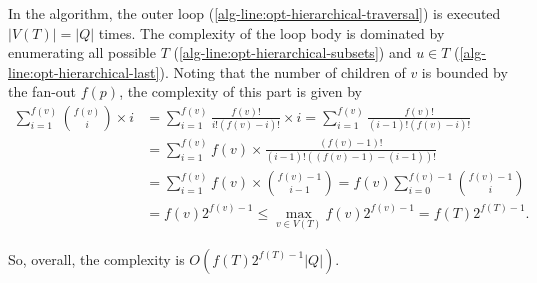 In the algorithm, the outer loop (\cref{alg-line:opt-hierarchical-traversal}) is executed $|V(T)| = |Q|$ times. The complexity of the loop body is dominated by enumerating all possible $T$ (\cref{alg-line:opt-hierarchical-subsets}) and $u \in T$ (\cref{alg-line:opt-hierarchical-last}). Noting that the number of children of $v$ is bounded by the fan-out $f(p)$, the complexity of this part is given by
\begin{align*}
    \sum_{i = 1}^{f(v)} \binom{f(v)}{i} \times i &= \sum_{i = 1}^{f(v)} \frac{f(v)!}{i! (f(v) - i)!} \times i = \sum_{i = 1}^{f(v)} \frac{f(v)!}{(i-1)! (f(v) - i)!} \\
    & = \sum_{i = 1}^{f(v)} f(v) \times \frac{(f(v) - 1)!}{(i-1)! ((f(v) - 1) - (i-1))!} \\
    & = \sum_{i = 1}^{f(v)} f(v) \times \binom{f(v) - 1}{i - 1} = f(v) \sum_{i = 0}^{f(v) - 1} \binom{f(v) - 1}{i} \\
    & = f(v) 2^{f(v) - 1} \leq \max_{v \in V(T)} f(v) 2^{f(v) - 1} = f(T) 2^{f(T) - 1}.
\end{align*}

So, overall, the complexity is $O(f(T) 2^{f(T) - 1} |Q|)$.

